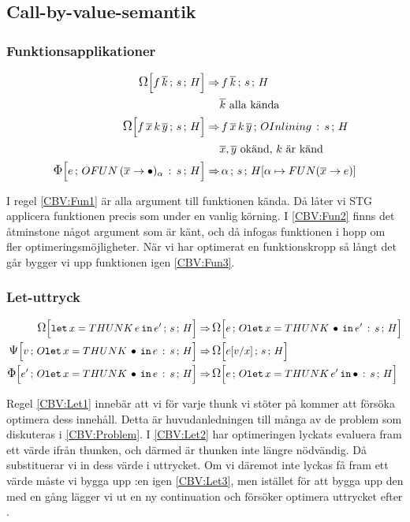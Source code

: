\documentclass[../Optimise]{subfiles}
\begin{document}

\subsection{Call-by-value-semantik}
\label{sec:Optimise:CBV}

\subsubsection{Funktionsapplikationer}

\begin{align}
\label{CBV:Fun1} \OMEGA sH{f\,\many{k}}  \Rightarrow &\, \mc{f\,\many{k}}sH\\
 & \many{k} \text{ alla kända} \nonumber \\
\label{CBV:Fun2} \OMEGA sH{f\,\many{x}\, k\,\many{y}}  \Rightarrow &\, \mc{f\,\many{x}\, k\,\many{y}}{\oInline s}H\\
 & \many{x},\many{y} \text{ okänd, } k \text{ är känd} \nonumber \\
\label{CBV:Fun3} \IRR{\cOFUN{\many{x}}{\alpha}s}He  \Rightarrow &\, \mc{\alpha}s{\heap{\alpha}{\FUN{\many{x}}e}}
\end{align}

I regel \eqref{CBV:Fun1} är alla argument till funktionen kända. Då låter vi STG 
applicera funktionen precis som under en vanlig körning. I \eqref{CBV:Fun2} finns det 
åtminstone något argument som är känt, och då infogas funktionen i hopp om
fler optimeringsmöjligheter.
När vi har optimerat en funktionskropp så långt det går bygger vi upp funktionen igen \eqref{CBV:Fun3}.


\subsubsection{Let-uttryck}

\begin{align}
\label{CBV:Let1} \OMEGA sH{\eLet x{\THUNK e}{e'}}  \Rightarrow &\, \OMEGA{\oLet x{e'}s}He\\
\label{CBV:Let2} \PSI{\oLet xes}Hv  \Rightarrow &\, \OMEGA sH{e[v/x]} \\
\label{CBV:Let3} \IRR{\oLet xes}H{e'}  \Rightarrow &\, \OMEGA{\oLetObj x{\THUNK{e'}}s}He
\end{align}

Regel \eqref{CBV:Let1} innebär att vi för varje thunk vi stöter på kommer att försöka optimera
dess innehåll. Detta är huvudanledningen till många av de problem som diskuteras i \ref{CBV:Problem}.
I \eqref{CBV:Let2} har optimeringen lyckats evaluera fram ett värde ifrån thunken, och
därmed är thunken inte längre nödvändig. Då substituerar vi in dess värde i uttrycket. 
Om vi däremot inte lyckas få fram ett värde måste vi bygga upp :en igen \eqref{CBV:Let3}, 
men istället för att bygga upp den med en gång lägger vi ut en ny continuation och 
försöker optimera uttrycket efter .
\end{document}
